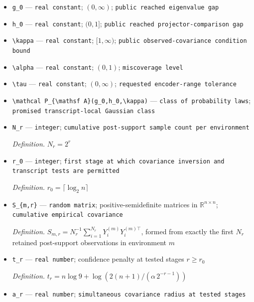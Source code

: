 \documentclass{article}
\begin{document}
\begin{itemize}
  \item \texttt{g\_\allowbreak{}0} --- \texttt{real constant}; \((0,\infty)\); \texttt{public reached eigenvalue gap}
  \item \texttt{h\_\allowbreak{}0} --- \texttt{real constant}; \((0,1]\); \texttt{public reached projector-\allowbreak{}comparison gap}
  \item \texttt{\textbackslash{}\allowbreak{}kappa} --- \texttt{real constant}; \([1,\infty)\); \texttt{public observed-\allowbreak{}covariance condition bound}
  \item \texttt{\textbackslash{}\allowbreak{}alpha} --- \texttt{real constant}; \((0,1)\); \texttt{miscoverage level}
  \item \texttt{\textbackslash{}\allowbreak{}tau} --- \texttt{real constant}; \((0,\infty)\); \texttt{requested encoder-\allowbreak{}range tolerance}
  \item \texttt{\textbackslash{}\allowbreak{}mathcal P\_\allowbreak{}\{\textbackslash{}\allowbreak{}mathsf A\}\allowbreak{}(g\_\allowbreak{}0,\allowbreak{}h\_\allowbreak{}0,\allowbreak{}\textbackslash{}\allowbreak{}kappa)} --- \texttt{class of probability laws}; \texttt{promised transcript-\allowbreak{}local Gaussian class}
  \item \texttt{N\_\allowbreak{}r} --- \texttt{integer}; \texttt{cumulative post-\allowbreak{}support sample count per environment}
  \par\smallskip\noindent\emph{Definition.} \(N_r=2^r\)
  \item \texttt{r\_\allowbreak{}0} --- \texttt{integer}; \texttt{first stage at which covariance inversion and transcript tests are permitted}
  \par\smallskip\noindent\emph{Definition.} \(r_0=\lceil\log_2 n\rceil\)
  \item \texttt{S\_\allowbreak{}\{m,\allowbreak{}r\}\allowbreak{}} --- \texttt{random matrix}; positive-semidefinite matrices in \(\mathbb R^{n\times n}\); \texttt{cumulative empirical covariance}
  \par\smallskip\noindent\emph{Definition.} \(S_{m,r}=N_r^{-1}\sum_{i=1}^{N_r}Y_i^{(m)}Y_i^{(m)\top}\), formed from exactly the first \(N_r\) retained post-support observations in environment \(m\)
  \item \texttt{t\_\allowbreak{}r} --- \texttt{real number}; confidence penalty at tested stages \(r\ge r_0\)
  \par\smallskip\noindent\emph{Definition.} \(t_r=n\log 9+\log(2(n+1)/(\alpha\,2^{-r-1}))\)
  \item \texttt{a\_\allowbreak{}r} --- \texttt{real number}; \texttt{simultaneous covariance radius at tested stages}

\end{itemize}
\end{document}

